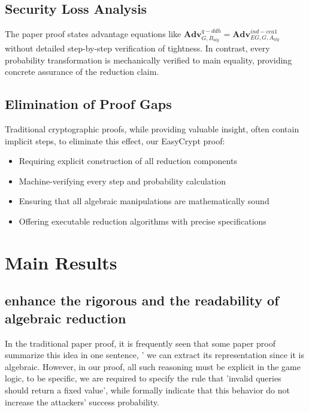 \subsection{Security Loss Analysis}

The paper proof states advantage equations like $\mathbf{Adv}^{q-ddh}_{G,B_{alg}} = \mathbf{Adv}^{ind-cca1}_{EG,G,A_{alg}}$ without detailed step-by-step verification of tightness. In contrast, every probability transformation is mechanically verified to main equality, providing concrete assurance of the reduction claim.

\subsection{Elimination of Proof Gaps}

Traditional cryptographic proofs, while providing valuable insight, often contain implicit steps, to eliminate this effect, our EasyCrypt proof: 

\begin{itemize}
\item Requiring explicit construction of all reduction components
\item Machine-verifying every step and probability calculation
\item Ensuring that all algebraic manipulations are mathematically sound
\item Offering executable reduction algorithms with precise specifications
\end{itemize}





\section{Main Results}

\subsection{enhance the rigorous and the readability of algebraic reduction}
In the traditional paper proof, it is frequently seen that some paper proof summarize this idea in one sentence, ' we can extract its representation since it is algebraic. However, in our proof, all such reasoning must be explicit in the game logic, to be specific, we are required to specify the rule that 'invalid queries should return a fixed value', while formally indicate that this behavior do not increase the attackers' success probability. 

